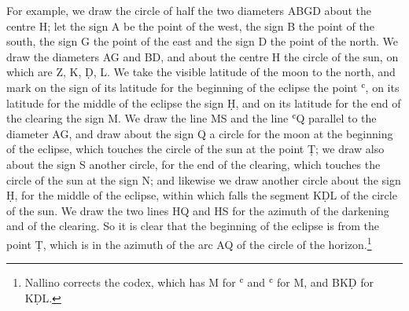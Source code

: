\documentclass[11pt]{article}
\begin{document}
\par For example, we draw the circle of half the two diameters ABGD about the centre H; let the sign A be the point of the west, the sign B the point of the south, the sign G the point of the east and the sign D the point of the north. We draw the diameters AG and BD, and about the centre H the circle of the sun, on which are Z, K, Ḍ, L. We take the visible latitude of the moon to the north, and mark on the sign of its latitude for the beginning of the eclipse the point ʿ, on its latitude for the middle of the eclipse the sign Ḥ, and on its latitude for the end of the clearing the sign M. We draw the line MS and the line ʿQ parallel to the diameter AG, and draw about the sign Q a circle for the moon at the beginning of the eclipse, which touches the circle of the sun at the point Ṭ; we draw also about the sign S another circle, for the end of the clearing, which touches the circle of the sun at the sign N; and likewise we draw another circle about the sign Ḥ, for the middle of the eclipse, within which falls the segment KḌL of the circle of the sun. We draw the two lines HQ and HS for the azimuth of the darkening and of the clearing. So it is clear that the beginning of the eclipse is from the point Ṭ, which is in the azimuth of the arc AQ of the circle of the horizon.\footnote{Nallino corrects the codex, which has M for ʿ and ʿ for M, and BKḌ for KḌL.}\par
\end{document}
